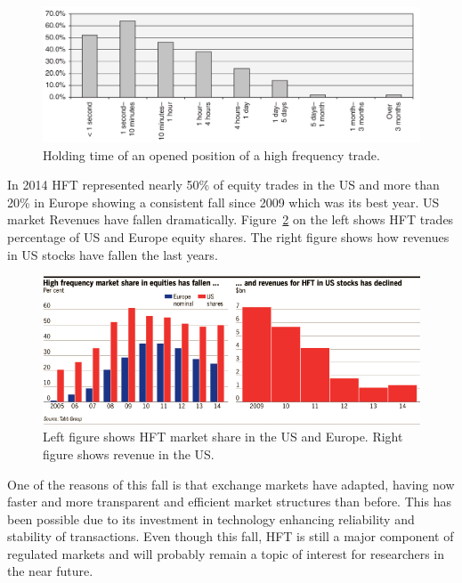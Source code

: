 \begin{figure}[!h]
  \centering
  \includegraphics[width=\textwidth]{img/HFTtradestime}
  \caption{Holding time of an opened position of a high frequency trade.}
  \label{fig:HFTtimes}
\end{figure}
In 2014 HFT represented nearly 50\% of equity trades in the US and more than 20\%
in Europe showing a consistent fall since 2009 which was its best year. US market Revenues
have fallen dramatically.
Figure~\ref{fig:HFTmarket} on the left shows HFT trades percentage of US and Europe equity shares. The right figure shows how revenues in US stocks have fallen the last years.

\begin{figure}[!h]
  \centering
  \includegraphics[width=\textwidth]{img/HFTmarket}
  \caption{Left figure shows HFT market share in the US and Europe. Right figure
  shows revenue in the US.}
  \label{fig:HFTmarket}
\end{figure}
One of the reasons of this fall is that exchange markets have adapted, having
now faster and more transparent and efficient market structures than before.
This has been possible due to its investment in technology enhancing
reliability and stability of transactions. Even though this fall, HFT is still a major component of regulated markets and
will probably remain a topic of interest for researchers in the near future.

